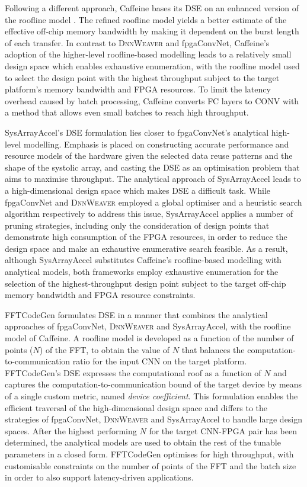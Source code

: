 \documentclass[format=acmsmall, review=false, screen=true]{acmart}
\begin{document}
Following a different approach, Caffeine bases its DSE on an enhanced version of the roofline model \cite{Williams2009}\cite{Zhang2015}. The refined roofline model yields a better estimate of the effective off-chip memory bandwidth by making it dependent on the burst length of each transfer. In contrast to \textsc{DnnWeaver} and fpgaConvNet, Caffeine's adoption of the higher-level roofline-based modelling leads to a relatively small design space which enables exhaustive enumeration, with the roofline model used to select the design point with the highest throughput subject to the target platform's memory bandwidth and FPGA resources. To limit the latency overhead caused by batch processing, Caffeine converts FC layers to CONV with a method that allows even small batches to reach high throughput. 


SysArrayAccel's DSE formulation lies closer to fpgaConvNet's analytical high-level modelling. Emphasis is placed on constructing accurate performance and resource models of the hardware given the selected data reuse patterns and the shape of the systolic array, and casting the DSE as an optimisation problem that aims to maximise throughput. The analytical approach of SysArrayAccel leads to a high-dimensional design space which makes DSE a difficult task. While fpgaConvNet and \textsc{DnnWeaver} employed a global optimiser and a heuristic search algorithm respectively to address this issue, SysArrayAccel applies a number of pruning strategies, including only the consideration of design points that demonstrate high consumption of the FPGA resources, in order to reduce the design space and make an exhaustive enumerative search feasible. As a result, although SysArrayAccel substitutes Caffeine's roofline-based modelling with analytical models, both frameworks employ exhaustive enumeration for the selection of the highest-throughput design point subject to the target off-chip memory bandwidth and FPGA resource constraints.

{\color{black}FFTCodeGen formulates DSE in a manner that combines the analytical approaches of fpgaConvNet, \textsc{DnnWeaver} and SysArrayAccel, with the roofline model of Caffeine. A roofline model is developed as a function of the number of points ($N$) of the FFT, to obtain the value of $N$ that balances the computation-to-communication ratio for the input CNN on the target platform. FFTCodeGen's DSE expresses the computational roof as a function of $N$ and captures the computation-to-communication bound of the target device by means of a single custom metric, named \textit{device coefficient}. This formulation enables the efficient traversal of the high-dimensional design space and differs to the strategies of fpgaConvNet, \textsc{DnnWeaver} and SysArrayAccel to handle large design spaces. After the highest performing $N$ for the target CNN-FPGA pair has been determined, the analytical models are used to obtain the rest of the tunable parameters in a closed form. FFTCodeGen optimises for high throughput, with customisable constraints on the number of points of the FFT and the batch size in order to also support latency-driven applications.}
\end{document}
